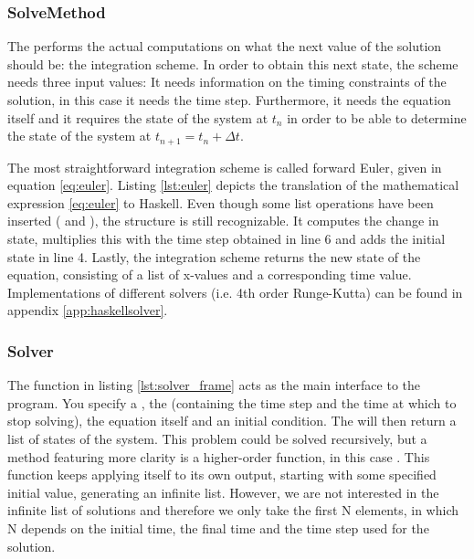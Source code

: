 \subsubsection{SolveMethod}
The  performs the actual computations on what the next value of the solution should be: the integration scheme. In order to obtain this next state, the scheme needs three input values: It needs information on the timing constraints of the solution, in this case it needs the time step. Furthermore, it needs the equation itself and it requires the state of the system at $t_{n}$ in order to be able to determine the state of the system at $t_{n+1} = t_{n} + \Delta t$.

The most straightforward integration scheme is called forward Euler, given in equation \ref{eq:euler}. Listing \ref{lst:euler} depicts the translation of the mathematical expression \ref{eq:euler} to Haskell. Even though some list operations have been inserted ( and ), the structure is still recognizable. It computes the change in state, multiplies this with the time step obtained in line 6 and adds the initial state in line 4. Lastly, the integration scheme returns the new state of the equation, consisting of a list of x-values and a corresponding time value. Implementations of different solvers (i.e. 4th order Runge-Kutta) can be found in appendix \ref{app:haskellsolver}.



\subsubsection{Solver}
The  function in listing \ref{lst:solver_frame} acts as the main interface to the program. You specify a , the  (containing the time step and the time at which to stop solving), the equation itself and an initial condition. The  will then return a list of states of the system. This problem could be solved recursively, but a method featuring more clarity is a higher-order function, in this case . This function keeps applying itself to its own output, starting with some specified initial value, generating an infinite list. However, we are not interested in the infinite list of solutions and therefore we only take the first N elements, in which N depends on the initial time, the final time and the time step used for the solution.


